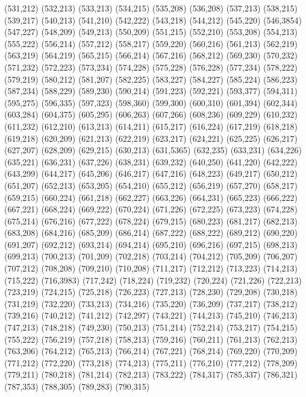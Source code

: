 (531,212)
(532,213)
(533,213)
(534,215)
(535,208)
(536,208)
(537,213)
(538,215)
(539,217)
(540,213)
(541,210)
(542,222)
(543,218)
(544,212)
(545,220)
(546,3854)
(547,227)
(548,209)
(549,213)
(550,209)
(551,215)
(552,210)
(553,208)
(554,213)
(555,222)
(556,214)
(557,212)
(558,217)
(559,220)
(560,216)
(561,213)
(562,219)
(563,219)
(564,219)
(565,215)
(566,214)
(567,216)
(568,212)
(569,230)
(570,232)
(571,232)
(572,223)
(573,234)
(574,228)
(575,228)
(576,228)
(577,234)
(578,222)
(579,219)
(580,212)
(581,207)
(582,225)
(583,227)
(584,227)
(585,224)
(586,223)
(587,234)
(588,229)
(589,230)
(590,214)
(591,223)
(592,221)
(593,377)
(594,311)
(595,275)
(596,335)
(597,323)
(598,360)
(599,300)
(600,310)
(601,394)
(602,344)
(603,284)
(604,375)
(605,295)
(606,263)
(607,266)
(608,236)
(609,229)
(610,232)
(611,232)
(612,210)
(613,213)
(614,211)
(615,217)
(616,224)
(617,219)
(618,218)
(619,218)
(620,209)
(621,213)
(622,219)
(623,217)
(624,221)
(625,225)
(626,217)
(627,207)
(628,209)
(629,215)
(630,213)
(631,5365)
(632,235)
(633,231)
(634,226)
(635,221)
(636,231)
(637,226)
(638,231)
(639,232)
(640,250)
(641,220)
(642,222)
(643,299)
(644,217)
(645,206)
(646,217)
(647,216)
(648,223)
(649,217)
(650,212)
(651,207)
(652,213)
(653,205)
(654,210)
(655,212)
(656,219)
(657,270)
(658,217)
(659,215)
(660,224)
(661,218)
(662,227)
(663,226)
(664,231)
(665,223)
(666,222)
(667,221)
(668,224)
(669,222)
(670,224)
(671,226)
(672,225)
(673,223)
(674,228)
(675,214)
(676,216)
(677,222)
(678,224)
(679,215)
(680,223)
(681,217)
(682,213)
(683,208)
(684,216)
(685,209)
(686,214)
(687,222)
(688,222)
(689,212)
(690,220)
(691,207)
(692,212)
(693,214)
(694,214)
(695,210)
(696,216)
(697,215)
(698,213)
(699,213)
(700,213)
(701,209)
(702,218)
(703,214)
(704,212)
(705,209)
(706,207)
(707,212)
(708,208)
(709,210)
(710,208)
(711,217)
(712,212)
(713,223)
(714,213)
(715,222)
(716,3983)
(717,242)
(718,224)
(719,232)
(720,224)
(721,226)
(722,213)
(723,219)
(724,215)
(725,218)
(726,223)
(727,213)
(728,230)
(729,208)
(730,218)
(731,219)
(732,220)
(733,213)
(734,216)
(735,220)
(736,209)
(737,217)
(738,212)
(739,216)
(740,212)
(741,212)
(742,297)
(743,221)
(744,213)
(745,210)
(746,213)
(747,213)
(748,218)
(749,230)
(750,213)
(751,214)
(752,214)
(753,217)
(754,215)
(755,222)
(756,219)
(757,218)
(758,213)
(759,216)
(760,211)
(761,213)
(762,213)
(763,206)
(764,212)
(765,213)
(766,214)
(767,221)
(768,214)
(769,220)
(770,209)
(771,212)
(772,220)
(773,218)
(774,213)
(775,211)
(776,210)
(777,212)
(778,209)
(779,211)
(780,218)
(781,214)
(782,213)
(783,222)
(784,317)
(785,337)
(786,321)
(787,353)
(788,305)
(789,283)
(790,315)
